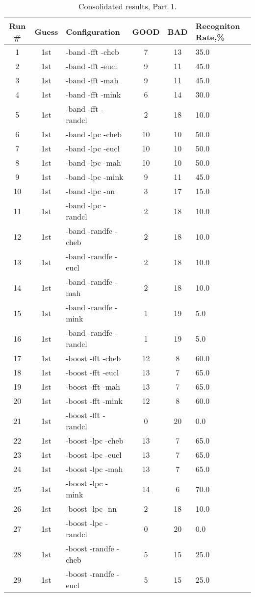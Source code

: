 \begin{table}
\centering
\begin{tabular}{|c|c|l|c|c|l|} \hline
Run \# & Guess & Configuration & GOOD & BAD & Recogniton Rate,\%\\ \hline\hline
1 & 1st & -band -fft -cheb & 7 & 13 & 35.0\\ \hline
2 & 1st & -band -fft -eucl & 9 & 11 & 45.0\\ \hline
3 & 1st & -band -fft -mah & 9 & 11 & 45.0\\ \hline
4 & 1st & -band -fft -mink & 6 & 14 & 30.0\\ \hline
5 & 1st & -band -fft -randcl & 2 & 18 & 10.0\\ \hline
6 & 1st & -band -lpc -cheb & 10 & 10 & 50.0\\ \hline
7 & 1st & -band -lpc -eucl & 10 & 10 & 50.0\\ \hline
8 & 1st & -band -lpc -mah & 10 & 10 & 50.0\\ \hline
9 & 1st & -band -lpc -mink & 9 & 11 & 45.0\\ \hline
10 & 1st & -band -lpc -nn & 3 & 17 & 15.0\\ \hline
11 & 1st & -band -lpc -randcl & 2 & 18 & 10.0\\ \hline
12 & 1st & -band -randfe -cheb & 2 & 18 & 10.0\\ \hline
13 & 1st & -band -randfe -eucl & 2 & 18 & 10.0\\ \hline
14 & 1st & -band -randfe -mah & 2 & 18 & 10.0\\ \hline
15 & 1st & -band -randfe -mink & 1 & 19 & 5.0\\ \hline
16 & 1st & -band -randfe -randcl & 1 & 19 & 5.0\\ \hline
17 & 1st & -boost -fft -cheb & 12 & 8 & 60.0\\ \hline
18 & 1st & -boost -fft -eucl & 13 & 7 & 65.0\\ \hline
19 & 1st & -boost -fft -mah & 13 & 7 & 65.0\\ \hline
20 & 1st & -boost -fft -mink & 12 & 8 & 60.0\\ \hline
21 & 1st & -boost -fft -randcl & 0 & 20 & 0.0\\ \hline
22 & 1st & -boost -lpc -cheb & 13 & 7 & 65.0\\ \hline
23 & 1st & -boost -lpc -eucl & 13 & 7 & 65.0\\ \hline
24 & 1st & -boost -lpc -mah & 13 & 7 & 65.0\\ \hline
25 & 1st & -boost -lpc -mink & 14 & 6 & 70.0\\ \hline
26 & 1st & -boost -lpc -nn & 2 & 18 & 10.0\\ \hline
27 & 1st & -boost -lpc -randcl & 0 & 20 & 0.0\\ \hline
28 & 1st & -boost -randfe -cheb & 5 & 15 & 25.0\\ \hline
29 & 1st & -boost -randfe -eucl & 5 & 15 & 25.0\\ \hline
\end{tabular}
\caption{Consolidated results, Part 1.}
\label{tab:results}
\end{table}


